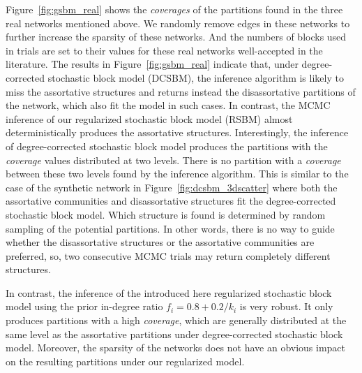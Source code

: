 Figure~\ref{fig:gsbm_real} shows the \textit{coverages} of the partitions found in the three real networks mentioned above. We randomly remove edges in these networks to further increase the sparsity of these networks. And the numbers of blocks used in trials are set to their values for these real networks well-accepted in the literature. The results in Figure~\ref{fig:gsbm_real} indicate that, under degree-corrected stochastic block model (DCSBM), the inference algorithm is likely to miss the assortative structures and returns instead the disassortative partitions of the network, which also fit the model in such cases. In contrast, the MCMC inference of our regularized stochastic block model (RSBM) almost deterministically produces the assortative structures. Interestingly, the inference of degree-corrected stochastic block model produces the partitions with the \textit{coverage} values distributed at two levels. There is no partition with a \textit{coverage} between these two levels found by the inference algorithm. This is similar to the case of the synthetic network in Figure~\ref{fig:dcsbm_3dscatter} where both the assortative communities and disassortative structures fit the degree-corrected stochastic block model. Which structure is found is determined by random sampling of the potential partitions. In other words, there is no way to guide whether the disassortative structures or the assortative communities are preferred, so, two consecutive MCMC trials may return completely different structures.

In contrast, the inference of the introduced here regularized stochastic block model using the prior in-degree ratio $f_i = 0.8 + 0.2 / k_i$ is very robust. It only produces partitions with a high \textit{coverage}, which are generally distributed at the same level as the assortative partitions under degree-corrected stochastic block model. Moreover, the sparsity of the networks does not have an obvious impact on the resulting partitions under our regularized model.


